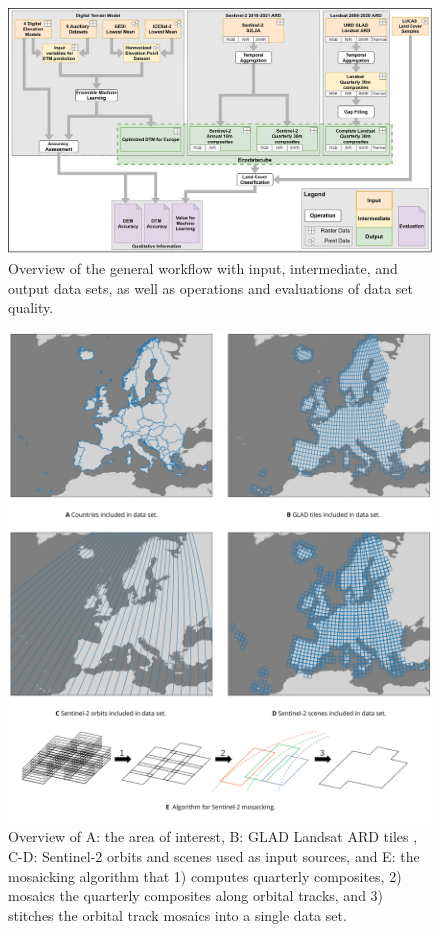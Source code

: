 \begin{figure}[!hbt]
\centering
\hspace*{-2.9cm}
\includegraphics[width=1.2\textwidth]{figs_02/fig_1_main_workflow.png}
\caption{Overview of the general workflow with input, intermediate, and output data sets, as well as operations and evaluations of data set quality.}
\label{fig:1_methods_workflow}
\end{figure}


\begin{figure}
    \includegraphics[width=\linewidth]{figs_02/fig_2_study_area_satellite_input.png}
    \caption{Overview of A: the area of interest, B: GLAD Landsat ARD tiles , C-D: Sentinel-2 orbits and scenes used as input sources, and E: the mosaicking algorithm that 1) computes quarterly composites, 2) mosaics the quarterly composites along orbital tracks, and 3) stitches the orbital track mosaics into a single data set.} 
    \label{fig:2_study_area_satellite_input}
\end{figure}



